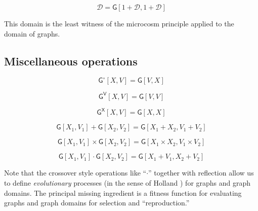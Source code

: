 \documentclass[12pt]{llncs}
\begin{document}
\[\mathcal{D} = \mathsf{G}[1 + \mathcal{D},1 + \mathcal{D}]\]

This domain is the least witness of the microcosm principle applied to
the domain of graphs.

\hypertarget{miscellaneous-operations}{%
\subsection{Miscellaneous operations}\label{miscellaneous-operations}}

\[\mathsf{G}^{\circ}[X,V] = \mathsf{G}[V,X]\]

\[\mathsf{G}^{\mathsf{V}}[X,V] = \mathsf{G}[V,V]\]

\[\mathsf{G}^{\mathsf{X}}[X,V] = \mathsf{G}[X,X]\]

\[\mathsf{G}[X_1,V_1] + \mathsf{G}[X_2,V_2] = \mathsf{G}[X_1+X_2,V_1 + V_2]\]

\[\mathsf{G}[X_1,V_1] \times \mathsf{G}[X_2,V_2] = \mathsf{G}[X_1 \times X_2,V_1 \times V_2]\]

\[\mathsf{G}[X_1,V_1] \cdot \mathsf{G}[X_2,V_2] = \mathsf{G}[X_1 + V_1,X_2 + V_2]\]

Note that the crossover style operations like ``\(\cdot\)'' together
with reflection allow us to define \emph{evolutionary} processes (in the
sense of Holland \cite{Holland1975}) for graphs and graph domains. The principal missing
ingredient is a fitness function for evaluating graphs and graph domains
for selection and ``reproduction.''





   

\end{document}
